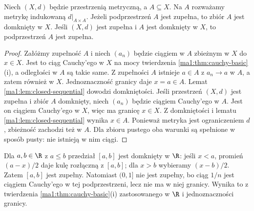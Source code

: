 \begin{twierdzenie}
\label{ma1:thm:complete-closed}
Niech $(X,d)$ będzie przestrzenią metryczną, a $A\subseteq X$. Na $A$ rozważamy metrykę indukowaną $d|_{A\times A}$. Jeżeli podprzestrzeń $A$ jest zupełna, to zbiór $A$ jest domknięty w $X$. Jeśli $(X,d)$ jest zupełna i $A$ jest domknięty w $X$, to podprzestrzeń $A$ jest zupełna.
\end{twierdzenie}
\begin{proof}
Załóżmy zupełność $A$ i niech $(a_n)$ będzie ciągiem w $A$ zbieżnym w $X$ do $x\in X$. Jest to ciąg Cauchy'ego w $X$ na mocy twierdzenia \ref{ma1:thm:cauchy-basic}(i), a odległości w $A$ są takie same. Z zupełności $A$ istnieje $a\in A$ z $a_n\to a$ w $A$, a zatem również w $X$. Jednoznaczność granicy daje $x=a\in A$. Lemat \ref{ma1:lem:closed-sequential} dowodzi domkniętości.
Jeśli przestrzeń $(X,d)$ jest zupełna i zbiór $A$ domknięty, niech $(a_n)$ będzie ciągiem Cauchy'ego w $A$. Jest on ciągiem Cauchy'ego w $X$, więc ma granicę $x\in X$. Z domkniętości i lematu \ref{ma1:lem:closed-sequential} wynika $x\in A$. Ponieważ metryka jest ograniczeniem $d$, zbieżność zachodzi też w $A$. Dla zbioru pustego oba warunki są spełnione w sposób pusty: nie istnieją w nim ciągi.
\end{proof}
\begin{przyklad}
Dla $a,b\in\R$ z $a\le b$ przedział $[a,b]$ jest domknięty w $\R$: jeśli $x<a$, promień $(a-x)/2$ daje kulę rozłączną z $[a,b]$; dla $x>b$ wybieramy $(x-b)/2$. Zatem $[a,b]$ jest zupełny. Natomiast $(0,1]$ nie jest zupełny, bo ciąg $1/n$ jest ciągiem Cauchy'ego w tej podprzestrzeni, lecz nie ma w niej granicy. Wynika to z twierdzenia \ref{ma1:thm:cauchy-basic}(i) zastosowanego w $\R$ i jednoznaczności granicy.
\end{przyklad}

